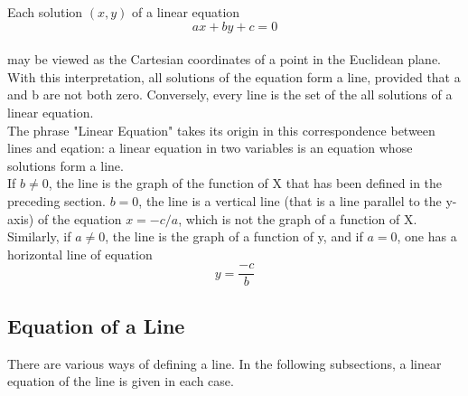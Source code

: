 \documentclass[a4paper, 12pt]{report}
\begin{document}
{         Each solution $(x, y)$ of a linear equation
         \begin{equation}
         ax + by + c = 0
         \end{equation}\\
          may be viewed as the Cartesian coordinates of a point in the Euclidean plane. With this interpretation, all solutions of the equation form a line, provided that a and b are not both zero. Conversely, every line is the set of the all solutions of a linear equation.\\
          The phrase "Linear Equation" takes its origin in this correspondence between lines and eqation: a linear equation in two variables is an equation whose solutions form a line.\\
          If $ b \neq 0$, the line is the graph of the function of X that has been defined in the preceding section. $b = 0$, the line is a vertical line (that is a line parallel to the y-axis) of the equation $x = -c/a$, which is not the graph of a function of X.\\
          Similarly, if $a \neq 0$, the line is the graph of a function of y, and if $a = 0$, one has a horizontal line of equation
          \begin{equation}
          y = \frac{-c}{b}
        \end{equation}           
          
         \subsection{Equation of a Line}
          There are various ways of defining a line. In the following subsections, a linear equation of the line is given in each case.\\
          
}
\end{document}
